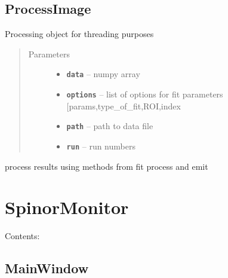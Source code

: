 \documentclass[letterpaper,10pt,english]{sphinxmanual}
\begin{document}
\section{ProcessImage}
\label{ProcessImage::doc}\label{ProcessImage:processimage}

\begin{fulllineitems}
\label{ProcessImage:Image.ProcessImage}
Processing object for threading purposes
\begin{quote}\begin{description}
\item[{Parameters}] \leavevmode\begin{itemize}
\item {} 
\textbf{\texttt{data}} -- numpy array

\item {} 
\textbf{\texttt{options}} -- list of options for fit parameters {[}params,type\_of\_fit,ROI,index

\item {} 
\textbf{\texttt{path}} -- path to data file

\item {} 
\textbf{\texttt{run}} -- run numbers

\end{itemize}

\end{description}\end{quote}

\begin{fulllineitems}
\label{ProcessImage:Image.ProcessImage.run}
process results using methods from fit process and emit

\end{fulllineitems}


\end{fulllineitems}



\chapter{SpinorMonitor}
\label{SpinorMonitor:spinormonitor}\label{SpinorMonitor::doc}
Contents:


\section{MainWindow}
\label{MainWindow:mainwindow}\label{MainWindow::doc}
\end{document}
